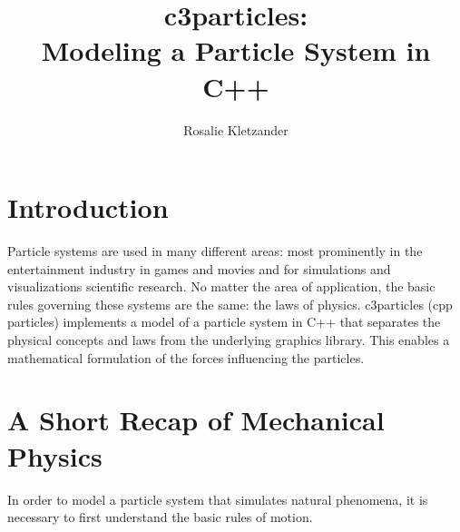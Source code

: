 \documentclass[runningheads,a4paper]{llncs}
\begin{document}
\mainmatter  %

\title{c3particles: \\ Modeling a Particle System in C++}


%
\author{Rosalie Kletzander}
%


\maketitle


%
%

\section{Introduction}
Particle systems are used in many different areas: most prominently in the entertainment industry in games and movies and for simulations and visualizations scientific research. No matter the area of application, the basic rules governing these systems are the same: the laws of physics. c3particles (cpp particles) implements a model of a particle system in C++ that separates the physical concepts and laws from the underlying graphics library. This enables a mathematical formulation of the forces influencing the particles.


\section{A Short Recap of Mechanical Physics}

In order to model a particle system that simulates natural phenomena, it is necessary to first understand the basic rules of motion.
\end{document}
